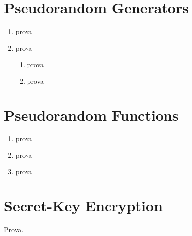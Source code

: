 \documentclass{article}
\begin{document}
\section{Pseudorandom Generators}

\begin{enumerate}
	\item prova

	\item prova
		\begin{enumerate}
			\item prova
			\item prova
		\end{enumerate}
\end{enumerate}

\section{Pseudorandom Functions}

\begin{enumerate}
	\item prova
	\item prova
	\item prova
\end{enumerate}

\section{Secret-Key Encryption}

Prova.
\end{document}

